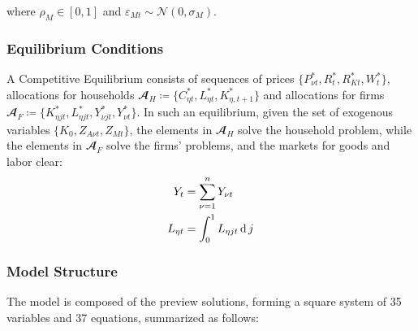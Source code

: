 \documentclass[
thesis.tex
]{subfiles}
\begin{document}
where $\rho_M \in [0,1]$ and $\varepsilon_{Mt} \sim \mathscr{N}(0,\sigma_M)$.


\subsubsection{Equilibrium Conditions}


A Competitive Equilibrium consists of sequences of prices $\{P_{\nu t}^\ast, R_t^\ast, R_{Kt}^\ast, W_t^\ast\}$, allocations for households $\mathbfscr{A}_H \coloneq \{C_{\eta t}^\ast, L_{\eta t}^\ast, K_{\eta, t+1}^\ast\}$ and allocations  for firms $\mathbfscr{A}_F \coloneq \{K_{\eta jt}^\ast, L_{\eta jt}^\ast, Y_{\nu jt}^\ast, Y_{\nu t}^\ast\}$. In such an equilibrium, given the set of exogenous variables $\{K_0, Z_{A\nu t}, Z_{Mt}\}$, the elements in $\mathbfscr{A}_H$ solve the household problem, while the elements in $\mathbfscr{A}_F$ solve the firms' problems, and the markets for goods and labor clear:
\begin{align}
	Y_t &= \sum_{\nu=1}^{n} Y_{\nu t} \label{eq:reg-market-clearing-condition} \\
	L_{\eta t} &= \int_{0}^{1} L_{\eta jt} \operatorname{d} j \label{eq:reg-market-clearing-condition-2}
\end{align}



\subsubsection*{Model Structure}

The model is composed of the preview solutions, forming a square system of 35 variables and 37 equations, summarized as follows:
\end{document}
